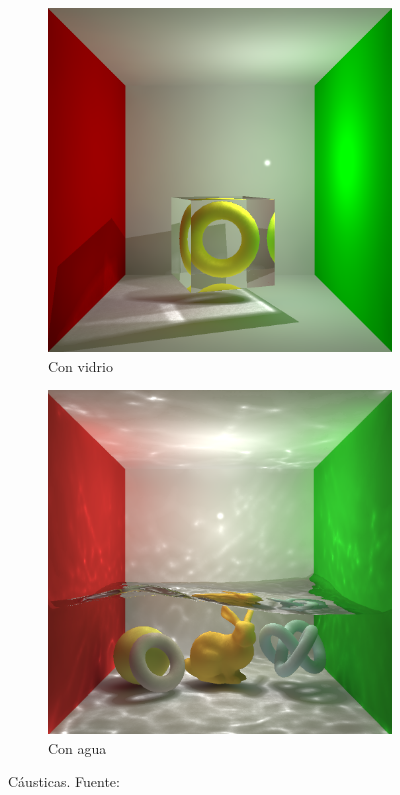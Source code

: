 \begin{figure}
    \begin{subfigure}{.5\textwidth}
        \centering
        \includegraphics[width=\textwidth]{photon-mapping-cornell-box-torus.png}
        \caption{Con vidrio}
    \end{subfigure}
    \begin{subfigure}{.5\textwidth}
        \centering
        \includegraphics[width=\textwidth]{photon-mapping-cornell-box-water.png}
        \caption{Con agua}
    \end{subfigure}
    \caption{Cáusticas. Fuente: \cite{faster-photon-mapping}}
    \label{fig:caustics}
\end{figure}

